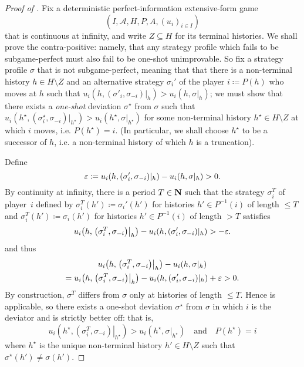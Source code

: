 \begin{proof}[Proof of ]
	Fix a deterministic perfect-information extensive-form game
	\begin{equation*}
		(I,\mathcal{A},H,P,A,(u_i)_{i \in I}) 
	\end{equation*}
	that is continuous at infinity, and write $Z \subseteq H$ for its terminal histories. We shall prove the contra-positive: namely, that any strategy profile which fails to be subgame-perfect must also fail to be one-shot unimprovable. So fix a strategy profile $\sigma$ that is not subgame-perfect, meaning that that there is a non-terminal history $h \in H \setminus Z$ and an alternative strategy $\sigma_i'$ of the player $i \coloneqq P(h)$ who moves at $h$ such that $u_i(h,(\sigma'_i,\sigma_{-i})|_h) > u_i(h,\sigma|_h)$; we must show that there exists a \emph{one-shot} deviation $\sigma^\star$ from $\sigma$ such that $u_i(h^\star,(\sigma^\star_i,\sigma_{-i})|_{h^\star}) > u_i(h^\star,\sigma|_{h^\star})$ for some non-terminal history $h^\star \in H \setminus Z$ at which $i$ moves, i.e. $P(h^\star)=i$. (In particular, we shall choose $h^\star$ to be a successor of $h$, i.e. a non-terminal history of which $h$ is a truncation).

	Define
	\begin{equation*}
		\varepsilon \coloneqq u_i(h,(\sigma'_i,\sigma_{-i})|_h) - u_i(h,\sigma|_h) > 0 .
	\end{equation*}
	By continuity at infinity, there is a period $T \in \mathbf{N}$ such that the strategy $\sigma_i^T$ of player~$i$ defined by $\sigma_i^T(h') \coloneqq \sigma_i'(h')$ for histories $h' \in P^{-1}(i)$ of length $\leq T$ and $\sigma_i^T(h') \coloneqq \sigma_i(h')$ for histories $h' \in P^{-1}(i)$ of length $> T$ satisfies
	\begin{equation*}
		u_i\left(h,\left.\left(\sigma^T_i,\sigma_{-i}\right)\right|_h\right) 
		- u_i(h,(\sigma_i',\sigma_{-i})|_h)
		> - \eps .
	\end{equation*}
	and thus
	\begin{multline*}
		u_i\left(h,\left.\left(\sigma^T_i,\sigma_{-i}\right)\right|_h\right)
		- u_i(h,\sigma|_h) 
		\\
		= u_i\left(h,\left.\left(\sigma^T_i,\sigma_{-i}\right)\right|_h\right)
		- u_i(h,(\sigma_i',\sigma_{-i})|_h) 
		+ \eps
		> 0 .
	\end{multline*}
	By construction, $\sigma^T$ differs from $\sigma$ only at histories of length $\leq T$. Hence  is applicable, so there exists a one-shot deviation $\sigma^\star$ from $\sigma$ in which $i$ is the deviator and is strictly better off: that is,
	\begin{equation*}
		u_i\left(h^\star,\left.\left(\sigma^T_i,\sigma_{-i}\right)\right|_{h^\star}\right)
		> u_i(h^\star,\sigma|_{h^\star})
		\quad \text{and} \quad
		P(h^\star)=i
	\end{equation*}
	where $h^\star$ is the unique non-terminal history $h' \in H \setminus Z$ such that $\sigma^\star(h') \neq \sigma(h')$.
\end{proof}



